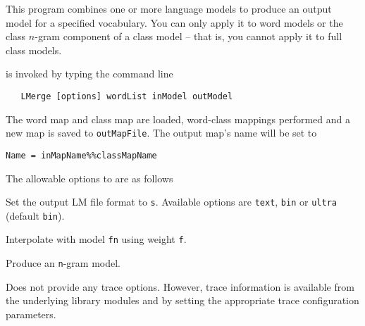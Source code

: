 %
%
%

\newpage
{}


This program combines one or more language models to produce an output 
model for a specified vocabulary.  You can only apply it to word
models or the class $n$-gram component of a class model -- that is,
you cannot apply it to full class models.


 is invoked by typing the command line
\begin{verbatim}
   LMerge [options] wordList inModel outModel
\end{verbatim}
The word map and class map are loaded, word-class mappings performed and 
a new map is saved to \texttt{outMapFile}. The output map's name will be
set to 
\begin{verbatim}
Name = inMapName%%classMapName
\end{verbatim}

The allowable options to  are as follows

\begin{optlist}
{
   Set the output LM file format to \texttt{s}. Available options
  are \texttt{text}, \texttt{bin} or \texttt{ultra} (default \texttt{bin}).

   Interpolate with model \texttt{fn} using weight \texttt{f}.

   Produce an \texttt{n}-gram model.

}
\end{optlist}



 Does not provide any trace options. However, trace 
information is available from the underlying library modules 
 and  by setting the appropriate trace
configuration parameters.

